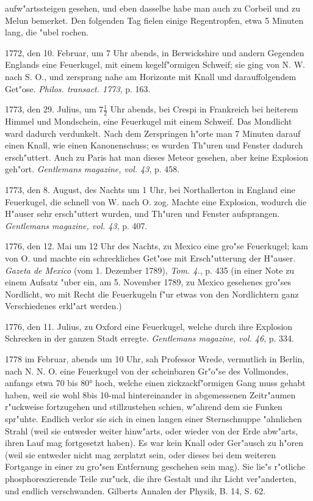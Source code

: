 \documentclass[a4paper, 11pt, oneside, polutonikogreek, german]{article}
\begin{document}
aufw"artssteigen gesehen, und eben dasselbe habe man auch zu Corbeil und zu Melun bemerket. Den folgenden Tag fielen einige Regentropfen, etwa 5 Minuten lang, die "ubel rochen.

1772, den 10. Februar, um 7 Uhr abends, in Berwickshire und andern Gegenden Englands eine Feuerkugel, mit einem kegelf"ormigen Schweif; sie ging von N. W. nach S. O., und zersprang nahe am Horizonte mit Knall und darauffolgendem Get"ose. \emph{Philos. transact. 1773}, p. 163.

1773, den 29. Julius, um $\mathfrak{7\frac{1}{2}}$ Uhr abends, bei Crespi in Frankreich bei heiterem Himmel und Mondschein, eine Feuerkugel mit einem Schweif. Das Mondlicht ward dadurch verdunkelt. Nach dem Zerspringen h"orte man 7 Minuten darauf einen Knall, wie einen Kanonenschuss; es wurden Th"uren und Fenster dadurch ersch"uttert. Auch zu Paris hat man dieses Meteor gesehen, aber keine Explosion geh"ort. \emph{Gentlemans magazine, vol. 43}, p. 458.

1773, den 8. August, des Nachts um 1 Uhr, bei Northallerton in England eine Feuerkugel, die schnell von W. nach O. zog. Machte eine Explosion, wodurch die H"auser sehr ersch"uttert wurden, und Th"uren und Fenster aufsprangen. \emph{Gentlemans magazine, vol. 43}, p. 407.

1776, den 12. Mai um 12 Uhr des Nachts, zu Mexico eine gro"se Feuerkugel; kam von O. und machte ein schreckliches Get"ose mit Ersch"utterung der H"auser. \emph{Gazeta de Mexico} (vom 1. Dezember 1789), \emph{Tom. 4.}, p. 435 (in einer Note zu einem Aufsatz "uber ein, am 5. November 1789, zu Mexico gesehenes gro"ses Nordlicht, wo mit Recht die Feuerkugeln f"ur etwas von den Nordlichtern ganz Verschiedenes erkl"art werden.)

1776, den 11. Julius, zu Oxford eine Feuerkugel, welche durch ihre Explosion Schrecken in der ganzen Stadt erregte. \emph{Gentlemans magazine, vol. 46}, p. 334.

1778 im Februar, abends um 10 Uhr, sah Professor Wrede, vermutlich in Berlin, nach N. N. O. eine Feuerkugel von der scheinbaren Gr"o"se des Vollmondes, anfangs etwa 70 bis 80° hoch, welche einen zickzackf"ormigen Gang muss gehabt haben, weil sie wohl 8bis 10-mal hintereinander in abgemessenen Zeitr"aumen r"uckweise fortzugehen und stillzustehen schien, w"ahrend dem sie Funken spr"uhte. Endlich verlor sie sich in einen langen einer Sternschnuppe "ahnlichen Strahl (weil sie entweder weiter hinw"arts, oder wieder von der Erde abw"arts, ihren Lauf mag fortgesetzt haben). Es war kein Knall oder Ger"ausch zu h"oren (weil sie entweder nicht mag zerplatzt sein, oder dieses bei dem weiteren Fortgange in einer zu gro"sen Entfernung geschehen sein mag). Sie lie"s r"otliche phosphoreszierende Teile zur"uck, die ihre Gestalt und ihr Licht ver"anderten, und endlich verschwanden. Gilberts Annalen der Physik, B. 14, S. 62.
\end{document}
